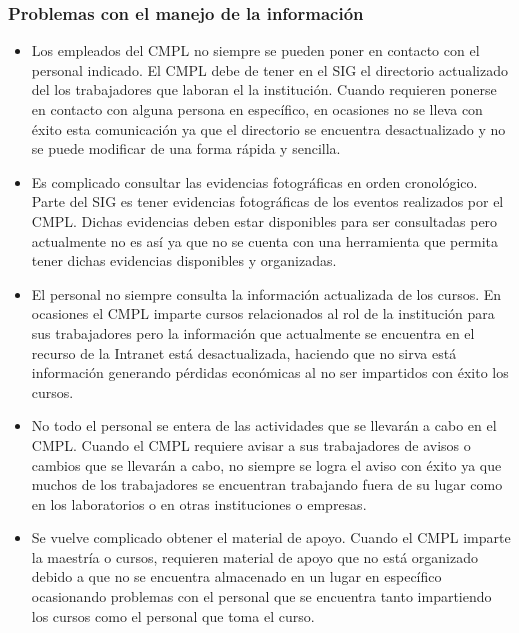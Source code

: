 		\subsubsection{Problemas con el manejo de la información}
\begin{itemize}
	
	\item Los empleados del CMPL no siempre se pueden poner en contacto con el personal indicado.	
El CMPL debe de tener en el SIG el directorio actualizado del los trabajadores que laboran el la institución. Cuando requieren ponerse en contacto con alguna persona en específico, en ocasiones no se lleva con éxito esta comunicación ya que el directorio se encuentra desactualizado y no se puede modificar de una forma rápida y sencilla.
	
	\item Es complicado consultar las evidencias fotográficas en orden cronológico.
Parte del SIG es tener evidencias fotográficas de los eventos realizados por el CMPL. Dichas evidencias deben estar disponibles para ser consultadas pero actualmente no es así ya que no se cuenta con una herramienta que permita tener dichas evidencias disponibles y organizadas.
	
	\item El personal no siempre consulta la información actualizada de los cursos.
En ocasiones el CMPL imparte cursos relacionados al rol de la institución para sus trabajadores pero la información que actualmente se encuentra en el recurso de la Intranet está desactualizada, haciendo que no sirva está información generando pérdidas económicas al no ser impartidos con éxito los cursos.

	\item No todo el personal se entera de las actividades que se llevarán a cabo en el CMPL.
Cuando el CMPL requiere avisar a sus trabajadores de avisos o cambios que se llevarán a cabo, no siempre se logra el aviso con éxito ya que muchos de los trabajadores se encuentran trabajando fuera de su lugar como en los laboratorios o en otras instituciones o empresas.	
	
	\item Se vuelve complicado obtener el material de apoyo.	
Cuando el CMPL imparte la maestría o cursos, requieren material de apoyo que no está organizado debido a que no se encuentra almacenado en un lugar en específico ocasionando problemas con el personal que se encuentra tanto impartiendo los cursos como el personal que toma el curso.	
	
\end{itemize}

